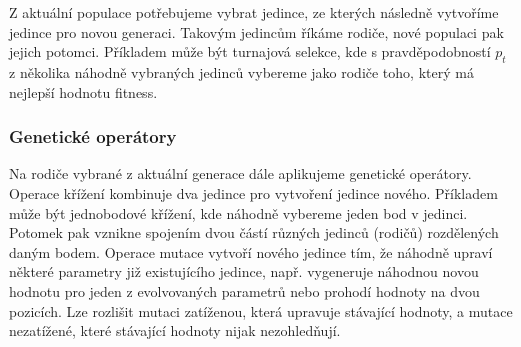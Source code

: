 Z aktuální populace potřebujeme vybrat jedince, ze kterých následně vytvoříme jedince pro novou generaci. Takovým jedincům říkáme rodiče, nové populaci pak jejich potomci. Příkladem může být turnajová selekce, kde s pravděpodobností $p_t$ z několika náhodně vybraných jedinců vybereme jako rodiče toho, který má nejlepší hodnotu fitness. 

\subsubsection*{Genetické operátory}

Na rodiče vybrané z aktuální generace dále aplikujeme genetické operátory. 
Operace křížení kombinuje dva jedince pro vytvoření jedince nového. Příkladem může být jednobodové křížení, kde náhodně vybereme jeden bod v jedinci. Potomek pak vznikne spojením dvou částí různých jedinců (rodičů) rozdělených daným bodem. 
Operace mutace vytvoří nového jedince tím, že náhodně upraví některé parametry již existujícího jedince, např. vygeneruje náhodnou novou hodnotu pro jeden z evolvovaných parametrů nebo prohodí hodnoty na dvou pozicích. Lze rozlišit mutaci zatíženou, která upravuje stávající hodnoty, a mutace nezatížené, které stávající hodnoty nijak nezohledňují.